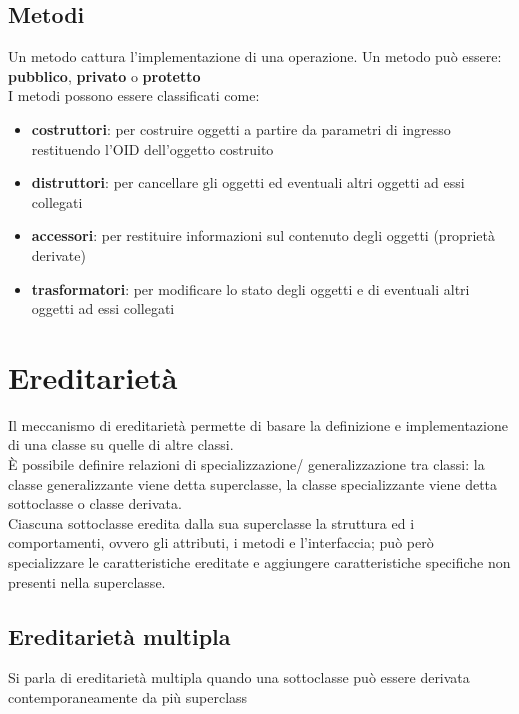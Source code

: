 \documentclass{report}
\begin{document}
            \subsection{Metodi}
                Un metodo cattura l’implementazione di una operazione. Un metodo può essere: \textbf{pubblico}, \textbf{privato} o \textbf{protetto}
                \\
                I metodi possono essere classificati come:
                \begin{itemize}
                    \item \textbf{costruttori}: per costruire oggetti a partire da parametri di ingresso restituendo l’OID dell’oggetto costruito
                    \item \textbf{distruttori}: per cancellare gli oggetti ed eventuali altri oggetti ad essi collegati
                    \item \textbf{accessori}: per restituire informazioni sul contenuto degli oggetti (proprietà derivate)
                    \item \textbf{trasformatori}: per modificare lo stato degli oggetti e di eventuali altri oggetti ad essi collegati
                \end{itemize}
        \section{Ereditarietà}
            Il meccanismo di ereditarietà permette di basare la definizione e implementazione di una classe su quelle di altre classi.
            \\
             È possibile definire relazioni di specializzazione/ generalizzazione tra classi: la classe generalizzante viene detta superclasse, la classe specializzante viene detta sottoclasse o classe derivata.
             \\
             Ciascuna sottoclasse eredita dalla sua superclasse la struttura ed i comportamenti, ovvero gli attributi, i metodi e l’interfaccia; può però specializzare le caratteristiche ereditate e aggiungere caratteristiche specifiche non presenti nella superclasse.
             \subsection{Ereditarietà multipla}
                Si parla di ereditarietà multipla quando una sottoclasse può essere derivata contemporaneamente da più superclass
\end{document}
